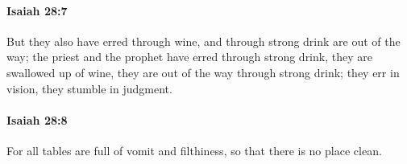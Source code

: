		\paragraph{Isaiah 28:7} %
			\label{ISAIAH-28-7}

			But they also have erred through wine, and through strong drink are out of the way; the priest and the prophet have erred through strong drink, they are swallowed up of wine, they are out of the way through strong drink; they err in vision, they stumble in judgment.


		\paragraph{Isaiah 28:8} %
			\label{ISAIAH-28-8}

			For all tables are full of vomit and filthiness, so that there is no place clean.


